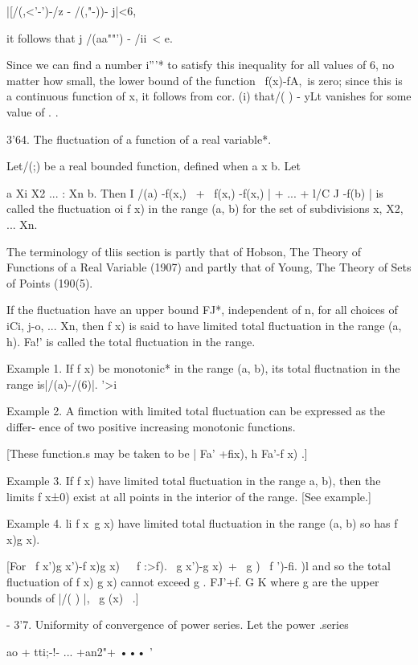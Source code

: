|[/(,<'-')-/z - /(,"-))- j|<6,

it follows that j /(aa""') - /ii\ < e.

Since we can find a number i'''* to satisfy this inequality for all
values of 6, no matter how small, the lower bound of the function \
f(x)-fA,\ is zero; since this is a continuous function of x, it
follows from cor. (i) that/( ) - yLt vanishes for some value of
. .

3'64. The fluctuation of a function of a real variable*.

Let/(;) be a real bounded function, defined when a x b. Let

a Xi X2 ... : Xn b. Then I /(a) -f(x,) \ + \ f(x,) -f(x,) | + ... +
l/C J -f(b) | is called the fluctuation oi f x) in the range (a, b)
for the set of subdivisions x, X2, ... Xn.

The terminology of tliis section is partly that of Hobson, The Theory
of Functions of a Real Variable (1907) and partly that of Young, The
Theory of Sets of Points (190(5).

%
%

If the fluctuation have an upper bound FJ*, independent of n, for all
choices of iCi, j-o, ... Xn, then f x) is said to have limited total
fluctuation in the range (a, h). Fa!' is called the total fluctuation
in the range.

Example 1. If f x) be monotonic* in the range (a, b), its total
fluctnation in the range is|/(a)-/(6)|. '>i

Example 2. A fimction with limited total fluctuation can be expressed
as the differ- ence of two positive increasing monotonic functions.

[These function.s may be taken to be | Fa' +fix), h Fa'-f x) .]

Example 3. If f x) have limited total fluctuation in the range a, b),
then the limits f x±0) exist at all points in the interior of the
range. [See\hardsectionref{3}{2} example.]

Example 4. li f x\ g x) have limited total fluctuation in the range
(a, b) so has f x)g x).

[For \ f x')g x')-f x)g x)\ \ \ f :>f). \ g x')-g x)\ + \ g ) \ f
')-fi. )l and so the total fluctuation of f x) g x) cannot exceed g .
FJ'+f. G K where g are the upper bounds of |/( ) |, \ g (x) \ .]

- 3'7. Uniformity of convergence of power series. Let the power
.series

ao + tti;-!- ... +an2"+ ••• '

